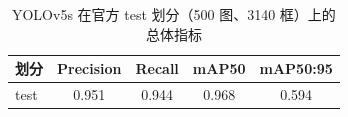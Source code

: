 \begin{table}[t]
\centering
\caption{YOLOv5s 在官方 test 划分（500 图、3140 框）上的总体指标}
\label{tab:yolo_overall}
\small
\begin{tabular}{lcccc}
\toprule
划分 & Precision & Recall & mAP50 & mAP50:95 \\
\midrule
test & 0.951 & 0.944 & 0.968 & 0.594 \\
\bottomrule
\end{tabular}
\end{table}
